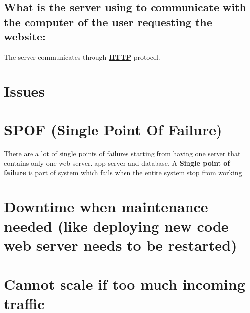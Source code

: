 \documentclass[a4paper, 10pt]{article}
\begin{document}
    \subsection*{What is the server using to communicate with
                    the computer of the user requesting the website: }
        The server communicates through \textbf{\underline{HTTP}} protocol.

\section{Issues}
    \section*{SPOF (Single Point Of Failure)}
        There are a lot of single points of failures starting from
        having one server that contains only one web server. app server
        and database. A \textbf{Single point of failure} is part of system which fails
        when the entire system stop from working
    \section*{Downtime when maintenance
                needed (like deploying new code web server needs to be restarted)}
    \section*{Cannot scale if too much incoming traffic}
\end{document}
